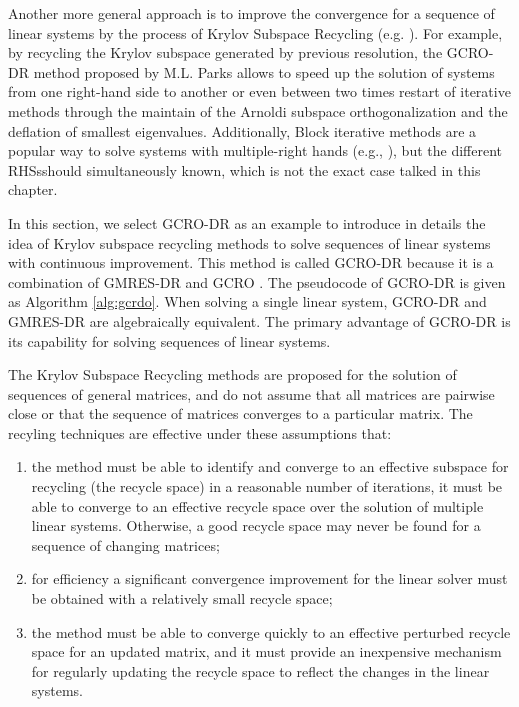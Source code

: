 Another more general approach is to improve the convergence for a sequence of linear systems by the process of Krylov Subspace Recycling (e.g. \cite{parks2006recycling,jolivet2016block,kilmer2006recycling,ye2008generalized}). For example, by recycling the Krylov subspace generated by previous resolution, the GCRO-DR method proposed by M.L. Parks \cite{parks2006recycling} allows to speed up the solution of systems from one right-hand side to another or even between two times restart of iterative methods through the maintain of the Arnoldi subspace orthogonalization and the deflation of smallest eigenvalues. Additionally, Block iterative methods are a popular way to solve systems with multiple-right hands (e.g., \cite{simoncini1995iterative,calvetti1994application, baker2006improving,gutknecht2006block}), but the different RHSsshould simultaneously known, which is not the exact case talked in this chapter. 

In this section, we select GCRO-DR as an example to introduce in details the idea of Krylov subspace recycling methods to solve sequences of linear systems with continuous improvement. This method is called GCRO-DR because it is a combination of GMRES-DR and GCRO \cite{de1996nested}. The pseudocode of GCRO-DR is given as Algorithm \ref{alg:gcrdo}. When solving a single linear system, GCRO-DR and GMRES-DR are algebraically equivalent. The primary advantage of GCRO-DR is its capability for solving sequences of linear systems.

The Krylov Subspace Recycling methods are proposed for the solution of sequences of general matrices, and do not assume that all matrices are pairwise close or that the sequence of matrices converges to a particular matrix. The recyling techniques are effective under these assumptions that: 
\begin{enumerate}[label=(\arabic*)]
	\item  the method must be able to identify and converge to an effective subspace for recycling (the recycle space) in a reasonable number of iterations, it must be able to converge to an effective recycle space over the solution of multiple linear systems. Otherwise, a good recycle space may never be found for a sequence of changing matrices;
	\item for efficiency a significant convergence improvement for the linear solver must be obtained with a relatively small recycle space;
	\item the method must be able to converge quickly to an effective perturbed recycle space for an updated matrix, and it must provide an inexpensive mechanism for regularly updating the recycle space to reflect the changes in the linear systems.
\end{enumerate}

